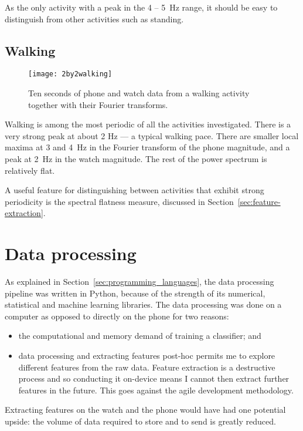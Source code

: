       As the only activity with a peak in the 4 -- 5~\si{Hz} range, it should be easy to distinguish from other activities such as standing.
    \pagebreak[4]
    \subsection{Walking}
      \begin{figure}[!th]
        \centering
        \texttt{[image: 2by2walking]}
        \caption[Walking sample]{Ten seconds of phone and watch data from a walking activity together with their Fourier transforms.}
        \label{fig:2by2walking}
      \end{figure}
      
      Walking is among the most periodic of all the activities investigated. There is a very strong peak at about 2 Hz --- a typical walking pace. There are smaller local maxima at 3 and 4~\si{Hz} in the Fourier transform of the phone magnitude, and a peak at 2~\si{Hz} in the watch magnitude. The rest of the power spectrum is relatively flat.
      
      A useful feature for distinguishing between activities that exhibit strong periodicity is the spectral flatness measure, discussed in Section~\ref{sec:feature-extraction}.
  \newpage
  \section{Data processing}
    \label{sec:data-processing}
    As explained in Section~\ref{sec:programming_languages}, the data processing pipeline was written in Python, because of the strength of its numerical, statistical and machine learning libraries. The data processing was done on a computer as opposed to directly on the phone for two reasons:
    \begin{itemize}
      \item the computational and memory demand of training a classifier; and
      \item data processing and extracting features post-hoc permits me to explore different features from the raw data. Feature extraction is a destructive process and so conducting it on-device means I cannot then extract further features in the future. This goes against the agile development methodology.
    \end{itemize}
    
    Extracting features on the watch and the phone would have had one potential upside: the volume of data required to store and to send is greatly reduced. 
    
